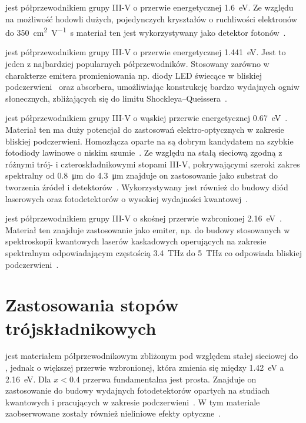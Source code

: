 \documentclass[12pt,openany,a4paper]{book}
\begin{document}
	 jest półprzewodnikiem grupy III-V o przerwie energetycznej \SI{1.6}{\electronvolt}. Ze względu na możliwość
	hodowli dużych, pojedynczych kryształów o ruchliwości elektronów do \SI{350}{\centi\metre^2\per\volt\second} materiał ten jest
	wykorzystywany jako detektor fotonów~\autocite{Seeger1991}.

	 jest półprzewodnikiem grupy III-V o przerwie energetycznej \SI{1.441}{\electronvolt}. Jest to jeden
	z najbardziej popularnych półprzewodników. Stosowany zarówno w charakterze emitera promieniowania np. diody LED świecące
	w bliskiej podczerwieni~\autocite{Hall1962} oraz absorbera, umożliwiając konstrukcję bardzo wydajnych ogniw słonecznych,
	zbliżających się do limitu Shockleya–Queissera~\autocite{Wang2013}.

	 jest półprzewodnikiem grupy III-V o wąskiej przerwie energetycznej \SI{0.67}{\electronvolt}~\autocite{Dubey2006}.
	Materiał ten ma duży potencjał do zastosowań elektro-optycznych w zakresie bliskiej podczerwieni. Homozłącza oparte na 
	są dobrym kandydatem na szybkie fotodiody lawinowe o niskim szumie~\autocite{Milnes1993}. Ze względu na stałą sieciową zgodną z różnymi
	trój- i czteroskładnikowymi stopami III-V, pokrywającymi szeroki zakres spektralny od \SI{0.8}{\micro \metre} do \SI{4.3}{\micro \metre}
	znajduje on zastosowanie jako substrat do tworzenia źródeł i detektorów~\autocite{Dutta1997}. Wykorzystywany jest również do budowy diód
laserowych oraz fotodetektorów o wysokiej wydajności kwantowej~\autocite{Hildebrand1980,Hildebrand1981}.

 jest półprzewodnikiem grupy III-V o skośnej przerwie wzbronionej \SI{2.16}{\electronvolt}~\autocite{Bouarissa2009}.
	Materiał ten znajduje zastosowanie jako emiter, np. do budowy stosowanych w spektroskopii kwantowych laserów kaskadowych operujących na zakresie
	spektralnym odpowiadającym częstością \SI{3.4}{\tera\hertz} do \SI{5}{\tera\hertz} co odpowiada bliskiej podczerwieni~\autocite{Schrottke2016}.


\section{Zastosowania stopów trójskładnikowych}
 jest materiałem półprzewodnikowym zbliżonym pod względem stałej sieciowej do ,
jednak o większej przerwie wzbronionej, która zmienia się między \SI{1.42}{\electronvolt} a \SI{2.16}{\electronvolt}.
Dla \(x < 0.4\) przerwa fundamentalna jest prosta. Znajduje on zastosowanie do budowy wydajnych fotodetektorów
opartych na studiach kwantowych i pracujących w zakresie podczerwieni~\autocite{Kock1992a}. W tym materiale zaobserwowane
zostały również nieliniowe efekty optyczne~\autocite{Aitchison1997}.
\end{document}
